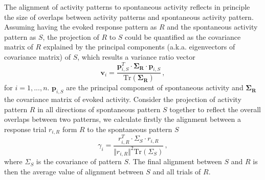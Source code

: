 \documentclass[11pt]{article}
\begin{document}
	The alignment of activity patterns to spontaneous activity reflects in principle the size of overlaps between activity patterns and spontaneous activity pattern. 
	Assuming having the evoked response pattern as $R$ and the spontaneous activity pattern as $S$, the projection of $R$ to $S$ could be quantified as the covariance matrix of $R$ explained by the principal components (a.k.a. eigenvectors of covariance matrix) of $S$, which results a variance ratio vector
		\begin{equation} \label{eq:var_explain_spont_act_sym}
			\mathbf{v}_i = \frac{\mathbf{p}_{i, S}^T \cdot \mathbf{\Sigma_R} \cdot \mathbf{p}_{i, S}}{\text{Tr}(\mathbf{\Sigma_R})} \, , 
		\end{equation}
	for $i = 1, ..., n$. $\mathbf{p}_{i, S}$ are the principal component of spontaneous activity and $\mathbf{\Sigma_R}$ the covariance matrix of evoked activity. 
	Consider the projection of activity pattern $R$ in all directions of spontaneous pattern $S$ together to reflect the overall overlaps between two patterns, we calculate firstly the alignment between a response trial $r_{i, R}$ form $R$ to the spontaneous pattern $S$ 
		\begin{equation} \label{eq:align_to_spont_act_sym}
			\gamma_i = \frac{r^T_{i, R} \cdot \Sigma_S \cdot r_{i,R}}{\Vert r_{i, R} \Vert^2 \text{Tr}(\Sigma_S)}\, ,
		\end{equation}
	where $\Sigma_S$ is the covariance of pattern $S$. The final alignment between $S$ and $R$ is then the average value of alignment between $S$ and all trials of $R$. 
	
\end{document}
